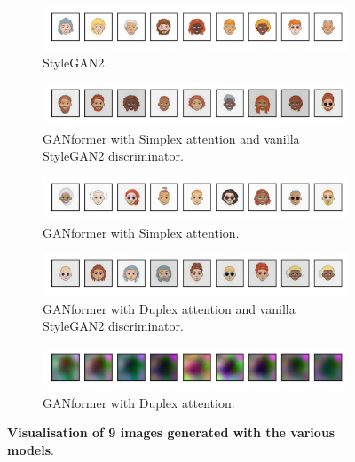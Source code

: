 \documentclass{article}
\begin{document}
	\begin{figure}[htpb]
		\centering
		\begin{subfigure}{\linewidth}
			\includegraphics[width=\linewidth]{random_Stylegan2_300kimg.png}
			\vspace{-7mm}
			\caption{StyleGAN2.} 
		\end{subfigure}
		\begin{subfigure}{\linewidth}
			\includegraphics[width=\linewidth]{random_GANFormer_Simplex_D_Stylegan2_300kimg.png}
			\vspace{-7mm}
			\caption{GANformer with Simplex attention and vanilla StyleGAN2 discriminator.}
		\end{subfigure}
		\begin{subfigure}{\linewidth}
			\includegraphics[width=\linewidth]{random_GANFormer_Simplex_D_Att_300kimg.png}
			\vspace{-7mm}
			\caption{GANformer with Simplex attention.}
		\end{subfigure}
		\begin{subfigure}{\linewidth}
			\includegraphics[width=\linewidth]{random_GANFormer_Duplex_D_Stylegan2_300kimg.png}
			\vspace{-7mm}
			\caption{GANformer with Duplex attention and vanilla StyleGAN2 discriminator.}
		\end{subfigure}
		\begin{subfigure}{\linewidth}
			\includegraphics[width=\linewidth]{random_GANFormer_Duplex_D_Att_300kimg.png}
			\vspace{-7mm}
			\caption{GANformer with Duplex attention.}
		\end{subfigure}
		\vspace{3mm}
		\caption{\textbf{Visualisation of 9 images generated with the various models}.}\label{fig:random}
	\end{figure}
	
\end{document}

